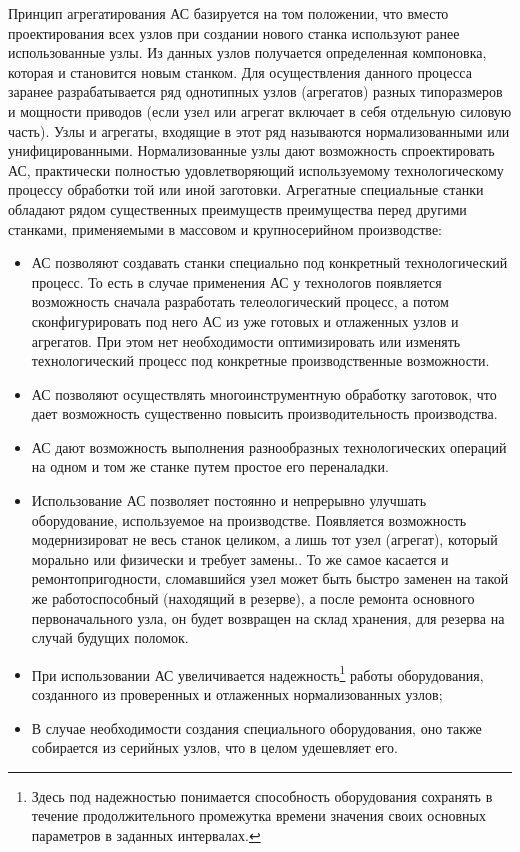 Принцип агрегатирования АС базируется на том положении, что вместо проектирования всех узлов при создании нового станка используют ранее использованные узлы. Из данных узлов получается определенная компоновка, которая и становится новым станком. Для осуществления данного процесса заранее разрабатывается ряд однотипных узлов (агрегатов) разных типоразмеров и мощности приводов (если узел или агрегат включает в себя отдельную силовую часть). Узлы и агрегаты, входящие в этот ряд называются нормализованными или унифицированными. Нормализованные узлы дают возможность спроектировать АС, практически полностью удовлетворяющий используемому технологическому процессу обработки той или иной заготовки. Агрегатные специальные станки обладают рядом существенных преимуществ преимущества перед другими станками, применяемыми в массовом и крупносерийном производстве:

\begin{itemize}
	\item АС позволяют создавать станки специально под конкретный технологический процесс. То есть в случае применения АС у технологов появляется возможность сначала разработать телеологический процесс, а потом сконфигурировать под него АС из уже готовых и отлаженных узлов и агрегатов. При этом нет необходимости оптимизировать или изменять технологический процесс под конкретные производственные возможности.
	\item АС позволяют осуществлять многоинструментную обработку заготовок, что дает возможность существенно повысить производительность производства.
	\item АС дают возможность выполнения разнообразных технологических операций на одном и том же станке путем простое его переналадки.
	\item Использование АС позволяет постоянно и непрерывно улучшать оборудование, используемое на производстве. Появляется возможность модернизироват не весь станок целиком, а лишь тот узел (агрегат), который морально или физически и требует замены.. То же самое касается и ремонтопригодности, сломавшийся узел может быть быстро заменен на такой же работоспособный (находящий в резерве), а после ремонта основного первоначального узла, он будет возвращен на склад хранения, для резерва на случай будущих поломок.
	\item При использовании АС увеличивается надежность\footnote{Здесь под надежностью понимается способность оборудования сохранять в течение продолжительного промежутка времени значения своих основных параметров в заданных интервалах.} работы оборудования, созданного из проверенных и отлаженных нормализованных узлов;
	\item В случае необходимости создания специального оборудования, оно также собирается из серийных узлов, что в целом удешевляет его.
\end{itemize}


